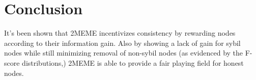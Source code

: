 \documentclass{article}
\begin{document}
	
\section{Conclusion}
It's been shown that 2MEME incentivizes consistency by rewarding nodes according to their information gain. Also by showing a lack of gain for sybil nodes while still minimizing removal of non-sybil nodes (as evidenced by the F-score distributions,) 2MEME is able to provide a fair playing field for honest nodes.
	
	
\end{document}
